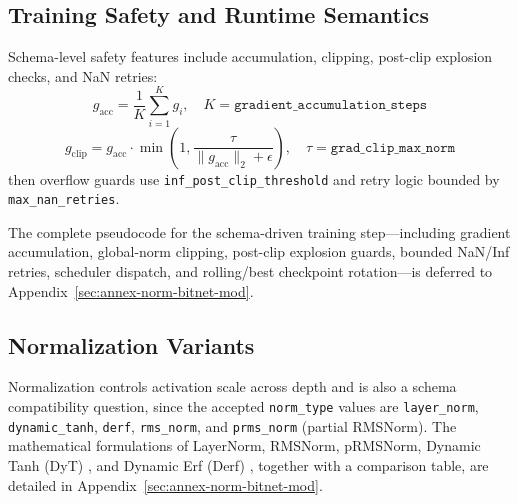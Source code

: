 \subsection{Training Safety and Runtime Semantics}

Schema-level safety features include accumulation, clipping, post-clip explosion checks, and NaN retries:
\[
g_{\text{acc}}=\frac{1}{K}\sum_{i=1}^{K} g_i,\quad K=\texttt{gradient\_accumulation\_steps}
\]
\[
g_{\text{clip}} = g_{\text{acc}}\cdot
\min\left(1,\frac{\tau}{\|g_{\text{acc}}\|_2+\epsilon}\right),\quad
\tau=\texttt{grad\_clip\_max\_norm}
\]
then overflow guards use \texttt{inf\_post\_clip\_threshold} and retry logic bounded by \texttt{max\_nan\_retries}.

The complete pseudocode for the schema-driven training step---including gradient accumulation, global-norm clipping, post-clip explosion guards, bounded NaN/Inf retries, scheduler dispatch, and rolling/best checkpoint rotation---is deferred to Appendix~\ref{sec:annex-norm-bitnet-mod}.

\subsection{Normalization Variants}
\label{sec:normalization}

Normalization controls activation scale across depth and is also a schema compatibility question, since the accepted \texttt{norm\_type} values are \texttt{layer\_norm}, \texttt{dynamic\_tanh}, \texttt{derf}, \texttt{rms\_norm}, and \texttt{prms\_norm} (partial RMSNorm). The mathematical formulations of LayerNorm, RMSNorm, pRMSNorm, Dynamic Tanh (DyT) \citep{zhu_transformers_2025}, and Dynamic Erf (Derf) \citep{chen_stronger_2025}, together with a comparison table, are detailed in Appendix~\ref{sec:annex-norm-bitnet-mod}.

